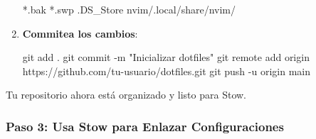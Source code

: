 \documentclass[
  jou,
  floatsintext,
  longtable,
  a4paper,
  nolmodern,
  notxfonts,
  notimes,
  colorlinks=true,linkcolor=blue,citecolor=blue,urlcolor=blue]{apa7}
\newenvironment{Shaded}{\begin{snugshade}}{\end{snugshade}}
\newcommand{\AttributeTok}[1]{\textcolor[rgb]{0.40,0.45,0.13}{#1}}
\newcommand{\FunctionTok}[1]{\textcolor[rgb]{0.28,0.35,0.67}{#1}}
\newcommand{\NormalTok}[1]{\textcolor[rgb]{0.00,0.23,0.31}{#1}}
\newcommand{\StringTok}[1]{\textcolor[rgb]{0.13,0.47,0.30}{#1}}
\begin{document}
\begin{enumerate}
\begin{Shaded}
\begin{Highlighting}[]
\NormalTok{*.bak}
\NormalTok{*.swp}
\NormalTok{.DS\_Store}
\NormalTok{nvim/.local/share/nvim/}
\end{Highlighting}
\end{Shaded}
\item
  \textbf{Commitea los cambios}:

\begin{Shaded}
\begin{Highlighting}[]
\FunctionTok{git}\NormalTok{ add .}
\FunctionTok{git}\NormalTok{ commit }\AttributeTok{{-}m} \StringTok{"Inicializar dotfiles"}
\FunctionTok{git}\NormalTok{ remote add origin https://github.com/tu{-}usuario/dotfiles.git}
\FunctionTok{git}\NormalTok{ push }\AttributeTok{{-}u}\NormalTok{ origin main}
\end{Highlighting}
\end{Shaded}
\end{enumerate}

Tu repositorio ahora está organizado y listo para Stow.

\subsubsection{Paso 3: Usa Stow para Enlazar
Configuraciones}\label{paso-3-usa-stow-para-enlazar-configuraciones}
\end{document}
